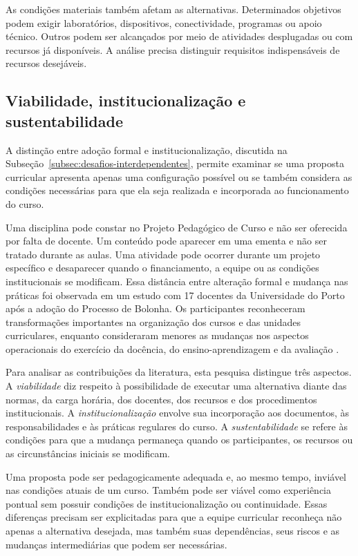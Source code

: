 As condições materiais também afetam as alternativas. Determinados objetivos podem exigir laboratórios, dispositivos, conectividade, programas ou apoio técnico. Outros podem ser alcançados por meio de atividades desplugadas ou com recursos já disponíveis. A análise precisa distinguir requisitos indispensáveis de recursos desejáveis.

\subsection{Viabilidade, institucionalização e sustentabilidade}
\label{subsec:viabilidade-institucionalizacao-sustentabilidade}

A distinção entre adoção formal e institucionalização, discutida na Subseção~\ref{subsec:desafios-interdependentes}, permite examinar se uma proposta curricular apresenta apenas uma configuração possível ou se também considera as condições necessárias para que ela seja realizada e incorporada ao funcionamento do curso.

Uma disciplina pode constar no Projeto Pedagógico de Curso e não ser oferecida por falta de docente. Um conteúdo pode aparecer em uma ementa e não ser tratado durante as aulas. Uma atividade pode ocorrer durante um projeto específico e desaparecer quando o financiamento, a equipe ou as condições institucionais se modificam. Essa distância entre alteração formal e mudança nas práticas foi observada em um estudo com 17 docentes da Universidade do Porto após a adoção do Processo de Bolonha. Os participantes reconheceram transformações importantes na organização dos cursos e das unidades curriculares, enquanto consideraram menores as mudanças nos aspectos operacionais do exercício da docência, do ensino-aprendizagem e da avaliação \cite{leiteramos2015reconfiguracoes}.

Para analisar as contribuições da literatura, esta pesquisa distingue três aspectos. A \textit{viabilidade} diz respeito à possibilidade de executar uma alternativa diante das normas, da carga horária, dos docentes, dos recursos e dos procedimentos institucionais. A \textit{institucionalização} envolve sua incorporação aos documentos, às responsabilidades e às práticas regulares do curso. A \textit{sustentabilidade} se refere às condições para que a mudança permaneça quando os participantes, os recursos ou as circunstâncias iniciais se modificam.

Uma proposta pode ser pedagogicamente adequada e, ao mesmo tempo, inviável nas condições atuais de um curso. Também pode ser viável como experiência pontual sem possuir condições de institucionalização ou continuidade. Essas diferenças precisam ser explicitadas para que a equipe curricular reconheça não apenas a alternativa desejada, mas também suas dependências, seus riscos e as mudanças intermediárias que podem ser necessárias.

